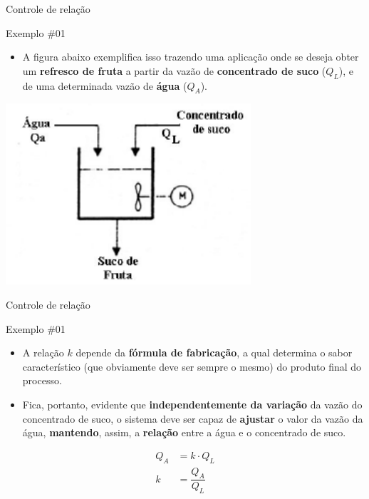 \begin{frame}{Controle de relação}
	\begin{block}{Exemplo \#01}
		\begin{itemize}
			\item A figura abaixo exemplifica isso trazendo uma aplicação onde se deseja obter um \textbf{refresco de fruta} a partir da vazão de \textbf{concentrado de suco} ($ Q_L $), e de uma determinada vazão de \textbf{água} ($ Q_A $).
		\end{itemize}
	\end{block}

	\vspace{0.3cm}

	\centering
	\includegraphics[width=0.5\linewidth]{Figuras/Ch15/fig10}
\end{frame}


\begin{frame}{Controle de relação}
	\begin{block}{Exemplo \#01}
		\begin{itemize}
			\item A relação $ k $ depende da \textbf{fórmula de fabricação}, a qual determina o sabor característico (que obviamente deve ser sempre o mesmo) do produto final do processo.
			\item Fica, portanto, evidente que \textbf{independentemente da variação} da vazão do concentrado de suco, o sistema deve ser capaz de \textbf{ajustar} o valor da vazão da água, \textbf{mantendo}, assim, a \textbf{relação} entre a água e o concentrado de suco.
		\end{itemize}
		
		\begin{align*}
		Q_A&=k\cdot Q_L\\
		k&=\dfrac{Q_A}{Q_L}
		\end{align*}
	\end{block}
\end{frame}


